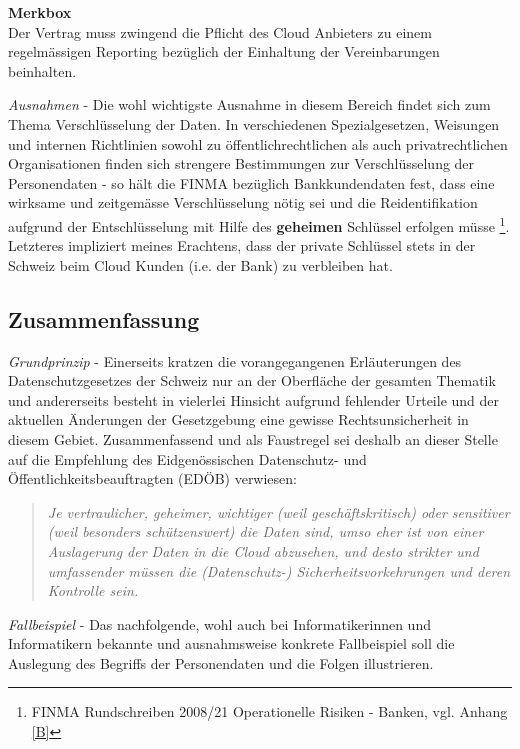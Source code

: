 \documentclass[a4paper,pointlessnumbers]{scrreprt}
\newcommand{\merkbox}[2][0.8\textwidth]{ \begin{center} \begin{tcolorbox}[enhanced, drop fuzzy midday shadow, width={#1}, opacityframe=0.5, colframe=BrickRed, colback=white] {\ECFTeenSpirit \color{BrickRed}\textbf{Merkbox} \qquad {\tiny das gilt es zu beachten}} \\  #2 \end{tcolorbox} \end{center}}
\begin{document}
\merkbox[0.7\textwidth]{Der Vertrag muss zwingend die Pflicht des Cloud Anbieters zu einem regelmässigen Reporting bezüglich der Einhaltung der Vereinbarungen beinhalten.}

\textit{Ausnahmen} - Die wohl wichtigste Ausnahme in diesem Bereich findet sich zum Thema Verschlüsselung der Daten. In verschiedenen Spezialgesetzen, Weisungen und internen Richtlinien sowohl zu öffentlichrechtlichen als auch privatrechtlichen Organisationen finden sich strengere Bestimmungen zur Verschlüsselung der Personendaten - so hält die FINMA bezüglich Bankkundendaten fest, dass \glqq eine wirksame und zeitgemässe Verschlüsselung\grqq{} nötig sei und \glqq die Reidentifikation aufgrund der Entschlüsselung mit Hilfe des \textbf{geheimen} Schlüssel\grqq{} erfolgen müsse \footnote{FINMA Rundschreiben 2008/21 Operationelle Risiken - Banken, vgl. Anhang \ref{B}}. Letzteres impliziert meines Erachtens, dass der private Schlüssel stets in der Schweiz beim Cloud Kunden (i.e. der Bank) zu verbleiben hat.

\subsection{Zusammenfassung}
\textit{Grundprinzip} - Einerseits kratzen die vorangegangenen Erläuterungen des Datenschutzgesetzes der Schweiz nur an der Oberfläche der gesamten Thematik und andererseits besteht in vielerlei Hinsicht aufgrund fehlender Urteile und der aktuellen Änderungen der Gesetzgebung eine gewisse Rechtsunsicherheit in diesem Gebiet. Zusammenfassend und als Faustregel sei deshalb an dieser Stelle auf die Empfehlung des Eidgenössischen Datenschutz- und Öffentlichkeitsbeauftragten (EDÖB) verwiesen:
\begin{quote}
\textit{Je vertraulicher, geheimer, wichtiger (weil geschäftskritisch) oder sensitiver (weil besonders schützenswert) die Daten sind, umso eher ist von einer Auslagerung der Daten in die Cloud abzusehen, und desto strikter und umfassender müssen die (Datenschutz-) Sicherheitsvorkehrungen und deren Kontrolle sein.}
\end{quote}

\textit{Fallbeispiel} - Das nachfolgende, wohl auch bei Informatikerinnen und Informatikern bekannte und ausnahmsweise konkrete Fallbeispiel soll die Auslegung des Begriffs der Personendaten und die Folgen illustrieren.
\end{document}
